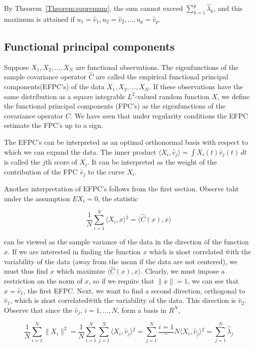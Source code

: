 By Theorem~\ref{Theorem:supremum}, the sum cannot exceed $\sum_{k=1}^{p}\hat{\lambda}_k$, and this maximum is attained if $u_1 = \hat{v}_1, u_2 = \hat{v}_2, \ldots, u_p = \hat{v}_p$.

\subsection{Functional principal components}

Suppose $X_1, X_2, \ldots, X_N$ are functional observations. The eigenfunctions of the sample covariance operator $\hat{C}$ are called the empirical functional principal components(EFPC's) of the data $X_1, X_2, \ldots, X_N$. If these observations have the same distribution as a square integrable $L^2$-valued random function $X$, we define the functional principal components (FPC's) as the eigenfunctions of the covariance operator $C$. We have seen that under regularity conditions the EFPC estimate the FPC's up to a sign.

The EFPC's can be interpreted as an optimal orthonormal basis with respect to which we can expand the data. The inner product $\langle{}X_i, \hat{v}_j\rangle{} = \int{} X_i(t)\hat{v}_j(t) \,dt$ is called the $j$th score of $X_i$. It can be interpreted as the weight of the contribution of the FPC $\hat{v}_j$ to the curve $X_i$.

Another interpretation of EFPC's follows from the first section. Observe taht under the assumption $EX_i = 0$, the statistic

\begin{equation}
  \frac{1}{N}\sum_{i = 1}^{N}\langle{}X_i, x\rangle{}^2 = \langle{}\hat{C}(x), x\rangle{}
\end{equation}

can be viewed as the sample variance of the data \" in the direction \" of the function $x$. If we are interested in finding the function $x$ which is \" most correlated \" with the variability of the data (away from the mean if the data are not centered), we must thus find $x$ which maximize $\langle{}\hat{C}(x), x\rangle{}$. Clearly, we must impose a restriction on the norm of $x$, so if we require that $\|x\| = 1$, we can see that $x = \hat{v}_1$, the first EFPC. Next, we want to find a second direction, orthogonal to $\hat{v}_1$, which is \"most correlated\" with the variability of the data. This direction is $\hat{v}_2$. Observe that since the $\hat{v}_j$, $i = 1, \ldots, N$, form a basis in $R^N$,

\begin{equation}
  \frac{1}{N}\sum_{i = 1}^{N}\|X_i\|^2 = \frac{1}{N}\sum_{i = 1}^{N}\sum_{j = 1}^{N}\langle{}X_i, \hat{v}_j\rangle{}^2 = \sum_{j = 1}^{N}\frac{i = 1}^{N}\langle{}X_i, \hat{v}_j\rangle{}^2 = \sum_{j = 1}^{N}\hat{\lambda}_j
\end{equation}

